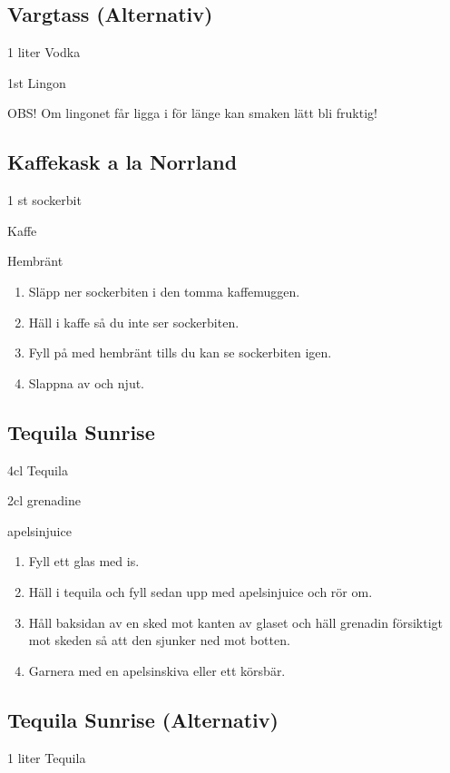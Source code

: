 \subsection*{\textbf{Vargtass (Alternativ)}}

1 liter Vodka

1st Lingon

OBS! Om lingonet får ligga i för länge kan smaken lätt bli fruktig!
\filbreak
\subsection*{\textbf{Kaffekask a la Norrland}}

1 st sockerbit

Kaffe

Hembränt

\begin{enumerate}
    \item Släpp ner sockerbiten i den tomma kaffemuggen.
    \item Häll i kaffe så du inte ser sockerbiten.
    \item Fyll på med hembränt tills du kan se sockerbiten igen.
    \item Slappna av och njut.
\end{enumerate}

\subsection*{\textbf{Tequila Sunrise}}

4cl Tequila

2cl grenadine

apelsinjuice

\begin{enumerate}
    \item Fyll ett glas med is.
    \item Häll i tequila och fyll sedan upp med apelsinjuice och rör om.
    \item Håll baksidan av en sked mot kanten av glaset och häll grenadin försiktigt mot skeden så att den sjunker ned mot botten.
    \item Garnera med en apelsinskiva eller ett körsbär.
\end{enumerate}
\filbreak
\subsection*{\textbf{Tequila Sunrise (Alternativ)}}

1 liter Tequila


